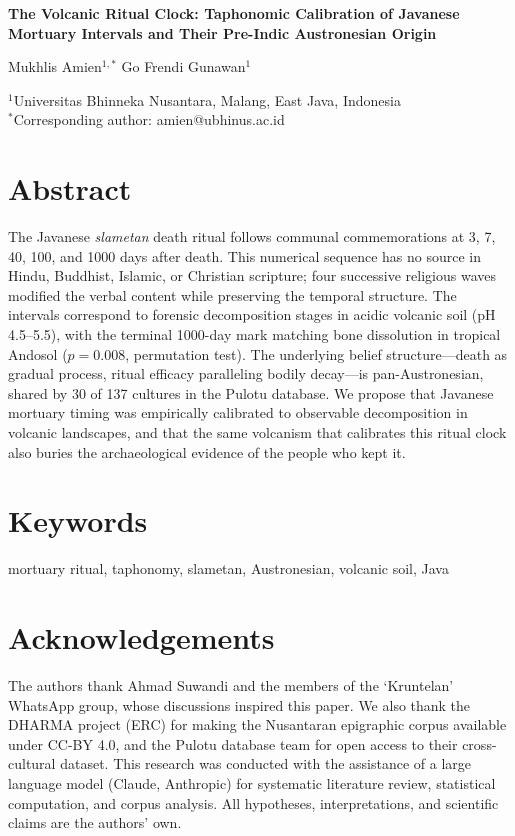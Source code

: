 \documentclass[12pt,a4paper]{article}
\begin{document}
\begin{center}
{\Large\bfseries The Volcanic Ritual Clock: Taphonomic Calibration of Javanese Mortuary Intervals and Their Pre-Indic Austronesian Origin}
\end{center}

\bigskip

\begin{center}
{\large Mukhlis Amien$^{1,*}$ \quad Go Frendi Gunawan$^{1}$}

\medskip

$^{1}$Universitas Bhinneka Nusantara, Malang, East Java, Indonesia\\
$^{*}$Corresponding author: amien@ubhinus.ac.id
\end{center}

\bigskip

\section*{Abstract}

The Javanese \textit{slametan} death ritual follows communal commemorations at 3, 7, 40, 100, and 1000 days after death. This numerical sequence has no source in Hindu, Buddhist, Islamic, or Christian scripture; four successive religious waves modified the verbal content while preserving the temporal structure. The intervals correspond to forensic decomposition stages in acidic volcanic soil (pH 4.5--5.5), with the terminal 1000-day mark matching bone dissolution in tropical Andosol ($p = 0.008$, permutation test). The underlying belief structure---death as gradual process, ritual efficacy paralleling bodily decay---is pan-Austronesian, shared by 30 of 137 cultures in the Pulotu database. We propose that Javanese mortuary timing was empirically calibrated to observable decomposition in volcanic landscapes, and that the same volcanism that calibrates this ritual clock also buries the archaeological evidence of the people who kept it.

\section*{Keywords}

mortuary ritual, taphonomy, slametan, Austronesian, volcanic soil, Java

\section*{Acknowledgements}

The authors thank Ahmad Suwandi and the members of the `Kruntelan' WhatsApp group, whose discussions inspired this paper. We also thank the DHARMA project (ERC) for making the Nusantaran epigraphic corpus available under CC-BY 4.0, and the Pulotu database team for open access to their cross-cultural dataset. This research was conducted with the assistance of a large language model (Claude, Anthropic) for systematic literature review, statistical computation, and corpus analysis. All hypotheses, interpretations, and scientific claims are the authors' own.
\end{document}
